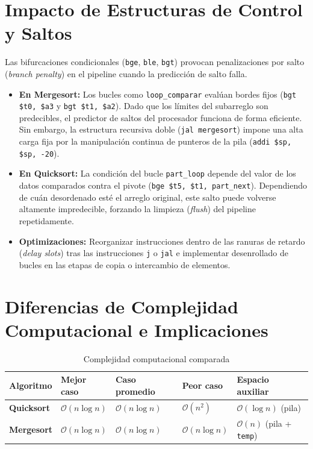 \documentclass[12pt,a4paper]{article}
\begin{document}
	
	\section{Impacto de Estructuras de Control y Saltos}
	
	Las bifurcaciones condicionales (\texttt{bge}, \texttt{ble}, \texttt{bgt}) provocan penalizaciones por salto (\textit{branch penalty}) en el pipeline cuando la predicción de salto falla.
	
	\begin{itemize}
		\item \textbf{En Mergesort:} Los bucles como \texttt{loop\_comparar} evalúan bordes fijos (\texttt{bgt \$t0, \$a3} y \texttt{bgt \$t1, \$a2}). Dado que los límites del subarreglo son predecibles, el predictor de saltos del procesador funciona de forma eficiente. Sin embargo, la estructura recursiva doble (\texttt{jal mergesort}) impone una alta carga fija por la manipulación continua de punteros de la pila (\texttt{addi \$sp, \$sp, -20}).
		\item \textbf{En Quicksort:} La condición del bucle \texttt{part\_loop} depende del valor de los datos comparados contra el pivote (\texttt{bge \$t5, \$t1, part\_next}). Dependiendo de cuán desordenado esté el arreglo original, este salto puede volverse altamente impredecible, forzando la limpieza (\textit{flush}) del pipeline repetidamente.
		\item \textbf{Optimizaciones:} Reorganizar instrucciones dentro de las ranuras de retardo (\textit{delay slots}) tras las instrucciones \texttt{j} o \texttt{jal} e implementar desenrollado de bucles en las etapas de copia o intercambio de elementos.
	\end{itemize}
	
	
	\section{Diferencias de Complejidad Computacional e Implicaciones}
	
	\begin{table}[h!]
		\centering
		\caption{Complejidad computacional comparada}
		\vspace{0.2cm}
		\begin{tabular}{l |l |l |l |l}
			\toprule
			\textbf{Algoritmo} & \textbf{Mejor caso} & \textbf{Caso promedio} & \textbf{Peor caso} & \textbf{Espacio auxiliar} \\
			\midrule
			\textbf{Quicksort} & $\mathcal{O}(n \log n)$ & $\mathcal{O}(n \log n)$ & $\mathcal{O}(n^2)$ & $\mathcal{O}(\log n)$ (pila) \\
			\textbf{Mergesort} & $\mathcal{O}(n \log n)$ & $\mathcal{O}(n \log n)$ & $\mathcal{O}(n \log n)$ & $\mathcal{O}(n)$ (pila + \texttt{temp}) \\
			\bottomrule
		\end{tabular}
	\end{table}
	
\end{document}
